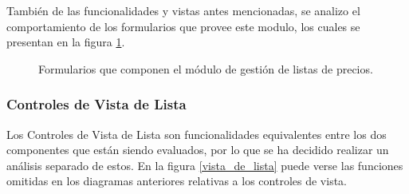 También de las funcionalidades y vistas antes mencionadas, se analizo el
comportamiento de los formularios que provee este modulo, los cuales se
presentan en la figura \ref{listas_de_precios_formularios}.

\begin{figure}
\centering
{}
\caption{Formularios que componen el módulo de gestión de listas de precios.}
\label{listas_de_precios_formularios}
\end{figure}

\subsubsection{Controles de Vista de Lista}
Los Controles de Vista de Lista son funcionalidades equivalentes entre los 
dos componentes que están siendo evaluados, por lo que se ha decidido realizar
un análisis separado de estos. En la figura \ref{vista_de_lista} puede verse
las funciones omitidas en los diagramas anteriores relativas a los controles de
vista.

